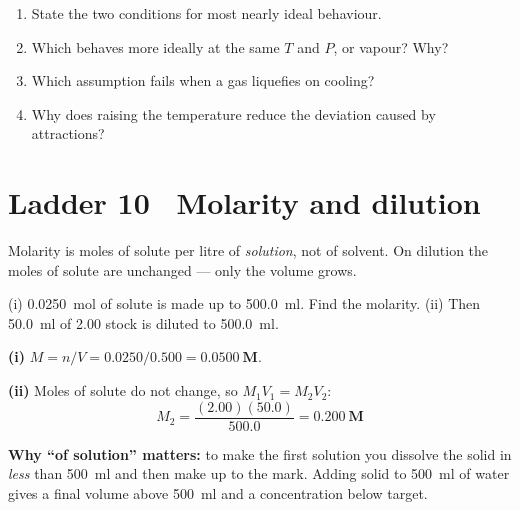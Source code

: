 \documentclass{apchem-worksheet}
\begin{document}
\begin{yourturn}
\begin{enumerate}[leftmargin=*,itemsep=0.5em]
  \item State the two conditions for most nearly ideal behaviour.
        \workspace[1.4cm]
  \item Which behaves more ideally at the same $T$ and $P$,  or
         vapour? Why? \workspace[1.8cm]
  \item Which assumption fails when a gas liquefies on cooling?
        \workspace[1.6cm]
  \item Why does raising the temperature reduce the deviation caused by
        attractions? \workspace[1.8cm]
\end{enumerate}
\end{yourturn}

\section*{\sffamily Ladder 10 \textbullet\ Molarity and dilution}

Molarity is moles of solute per litre of \emph{solution}, not of solvent.
On dilution the moles of solute are unchanged --- only the volume grows.

\begin{workedexample}
(i) \SI{0.0250}{\mole} of solute is made up to \SI{500.0}{\milli\litre}.
Find the molarity. (ii) Then \SI{50.0}{\milli\litre} of
\SI{2.00}{\Molar} stock is diluted to \SI{500.0}{\milli\litre}.

\textbf{(i)} $M = n/V = 0.0250/0.500 = \mathbf{0.0500~M}$.

\textbf{(ii)} Moles of solute do not change, so
$M_1V_1 = M_2V_2$:
\[ M_2 = \frac{(2.00)(50.0)}{500.0} = \mathbf{0.200~M} \]

\textbf{Why ``of solution'' matters:} to make the first solution you
dissolve the solid in \emph{less} than \SI{500}{\milli\litre} and then
make up to the mark. Adding solid to \SI{500}{\milli\litre} of water gives
a final volume above \SI{500}{\milli\litre} and a concentration below
target.
\end{workedexample}
\end{document}
